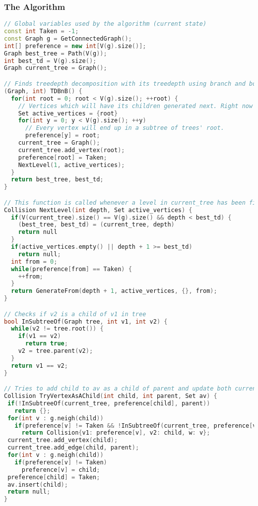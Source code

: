 \subsubsection{The Algorithm}
\begin{lstlisting}[language=C++]
// Global variables used by the algorithm (current state)
const int Taken = -1;
const Graph g = GetConnectedGraph();
int[] preference = new int[V(g).size()];
Graph best_tree = Path(V(g));
int best_td = V(g).size();
Graph current_tree = Graph();

// Finds treedepth decomposition with its treedepth using branch and bound technique
(Graph, int) TDBnB() {
  for(int root = 0; root < V(g).size(); ++root) {
    // Vertices which will have its children generated next. Right now it's just root.
    Set active_vertices = {root}
    for(int y = 0; y < V(g).size(); ++y)
      // Every vertex will end up in a subtree of trees' root.
      preference[y] = root;
    current_tree = Graph();
    current_tree.add_vertex(root);
    preference[root] = Taken;
    NextLevel(1, active_vertices);
  }
  return best_tree, best_td;
}

// This function is called whenever a level in current_tree has been finished. active_vertices is a set of vertices which will have its children chosen next. Depth tells us how deep finished level is. It checks whether we have a chance improving previous results and starts generation of next level.
Collision NextLevel(int depth, Set active_vertices) {
  if(V(current_tree).size() == V(g).size() && depth < best_td) {
    (best_tree, best_td) = (current_tree, depth)
    return null
  }
  if(active_vertices.empty() || depth + 1 >= best_td)
    return null;
  int from = 0;
  while(preference[from] == Taken) {
    ++from;
  }
  return GenerateFrom(depth + 1, active_vertices, {}, from);
}

// Checks if v2 is a child of v1 in tree
bool InSubtreeOf(Graph tree, int v1, int v2) {
  while(v2 != tree.root()) {
    if(v1 == v2)
      return true;
    v2 = tree.parent(v2);
  }
  return v1 == v2;
}

// Tries to add child to av as a child of parent and update both current_tree and history. When it contradics with treedepth decomposition definition, it returns an error and makes no changes to current state.
Collision TryVertexAsAChild(int child, int parent, Set av) {
 if(!InSubtreeOf(current_tree, preference[child], parent))
   return {};
 for(int v : g.neigh(child))
   if(preference[v] != Taken && !InSubtreeOf(current_tree, preference[v], parent))
     return Collision{v1: preference[v], v2: child, w: v};
 current_tree.add_vertex(child);
 current_tree.add_edge(child, parent);
 for(int v : g.neigh(child))
   if(preference[v] != Taken)
     preference[v] = child;
 preference[child] = Taken;
 av.insert(child);
 return null;
}


\end{lstlisting}
